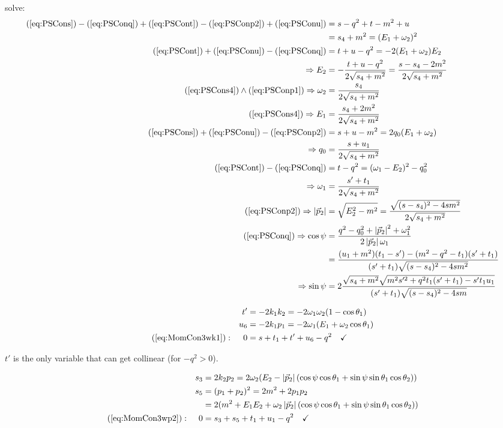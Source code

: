 solve:
\begin{align}
(\ref{eq:PSCons}) - (\ref{eq:PSConq}) + (\ref{eq:PSCont}) - (\ref{eq:PSConp2}) + (\ref{eq:PSConu}) &= s-q^2+t-m^2+u\\
 &= s_4+m^2 = (E_1+\omega_2)^2 \label{eq:PSCons4}\\
(\ref{eq:PSCont}) + (\ref{eq:PSConu}) - (\ref{eq:PSConq}) &= t+u-q^2 = -2(E_1+\omega_2)E_2\\
\Rightarrow E_2 &= -\frac{t+u-q^2}{2\sqrt{s_4+m^2}} =\frac{s-s_4-2m^2}{2\sqrt{s_4+m^2}} \label{eq:PSConE2}\\
(\ref{eq:PSCons4})\land (\ref{eq:PSConp1}) \Rightarrow \omega_2 &= \frac{s_4}{2\sqrt{s_4+m^2}} \label{eq:PSConom2} \\
(\ref{eq:PSCons4})\Rightarrow E_1 &= \frac{s_4+2m^2}{2\sqrt{s_4+m^2}} \label{eq:PSConE1} \\
(\ref{eq:PSCons})+(\ref{eq:PSConu})-(\ref{eq:PSConp2}) &= s+u-m^2 =2q_0(E_1+\omega_2)\\
\Rightarrow q_0 &= \frac{s+u_1}{2\sqrt{s_4+m^2}} \label{eq:PSConq0}\\
(\ref{eq:PSCont}) - (\ref{eq:PSConq}) &= t-q^2 = (\omega_1-E_2)^2 - q_0^2\\
\Rightarrow \omega_1 &= \frac{s'+t_1}{2\sqrt{s_4+m^2}} \label{eq:PSConom1}\\
(\ref{eq:PSConp2}) \Rightarrow \left|\vec p_2\right| &= \sqrt{E_2^2 - m^2} = \frac {\sqrt{(s-s_4)^2-4sm^2}} {2\sqrt{s_4+m^2}}\label{eq:PSConabsp2}\\
(\ref{eq:PSConq}) \Rightarrow \cos\psi &= \frac{q^2-q_0^2+\left|\vec p_2\right|^2+\omega_1^2}{2\left|\vec p_2\right|\omega_1}\\
 &= \frac {(u_1+m^2)(t_1-s')-(m^2-q^2-t_1)(s'+t_1)} {(s'+t_1)\sqrt{(s-s_4)^2-4sm^2}}\label{eq:PSConabcos}\\
\Rightarrow \sin\psi &= 2\frac{\sqrt{s_4+m^2}\sqrt{m^2s'^2+q^2t_1(s'+t_1)-s't_1u_1}}{(s'+t_1)\sqrt{(s-s_4)^2-4sm}}
\end{align}

\begin{align}
&&t' &= -2k_1k_2 = -2\omega_1\omega_2(1-\cos\theta_1)\\
&&u_6 &= - 2k_1p_1 = -2\omega_1(E_1 + \omega_2\cos\theta_1)\\
(\ref{eq:MomCon3wk1}): &&0 &= s+t_1+t'+u_6-q^2\quad\checkmark
\end{align}

$t'$ is the only variable that can get collinear (for $-q^2 > 0$).

\begin{align}
&&s_3 &= 2k_2p_2 = 2\omega_2(E_2-\left|\vec p_2\right|(\cos\psi\cos\theta_1+\sin\psi\sin\theta_1\cos\theta_2))\\
&&s_5 &= (p_1+p_2)^2 = 2m^2+2p_1p_2\\
&& &= 2(m^2+E_1E_2+\omega_2\left|\vec p_2\right|(\cos\psi\cos\theta_1+\sin\psi\sin\theta_1\cos\theta_2))\\
(\ref{eq:MomCon3wp2}): &&0 &= s_3+s_5+t_1+u_1-q^2\quad\checkmark
\end{align}

